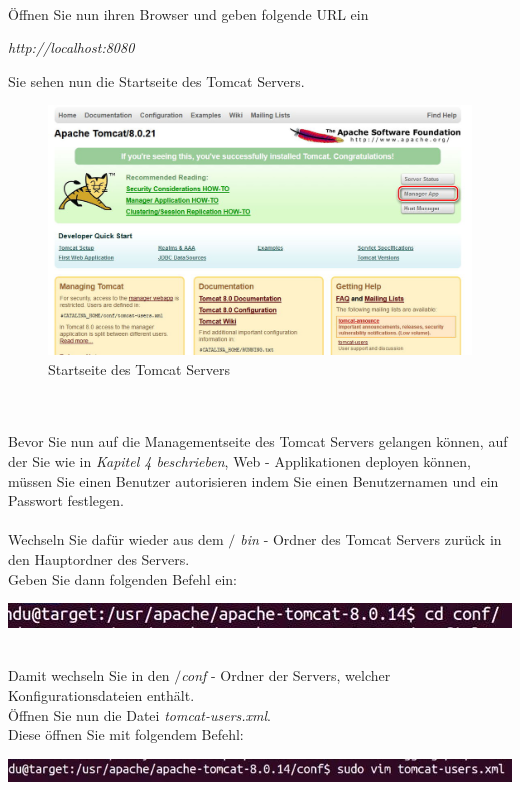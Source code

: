 \documentclass[a4paper, 12pt]{scrreprt}
\begin{document}
\ \\
Öffnen Sie nun ihren Browser und geben folgende URL ein
\begin{center}
	{\it http://localhost:8080}
\end{center}
Sie sehen nun die Startseite des Tomcat Servers.\begin{figure}
\centering
\includegraphics[width=0.8\linewidth]{Grafiken/ServerStartPage}
\caption{Startseite des Tomcat Servers}
\label{fig:ServerStartPage1}
\end{figure}
\ \\
\newpage
\ \\
Bevor Sie nun  auf die Managementseite des Tomcat Servers gelangen können, auf der Sie wie in {\it Kapitel 4 beschrieben}, Web - Applikationen deployen können, müssen Sie einen Benutzer autorisieren indem Sie einen Benutzernamen und ein Passwort festlegen.\ \\
\ \\
Wechseln Sie dafür wieder aus dem {\it$/$ bin} - Ordner des Tomcat Servers zurück in den Hauptordner des Servers.\\
Geben Sie dann folgenden Befehl ein:
\begin{center}
\includegraphics[width=0.7\linewidth]{Grafiken/conf-ordner}
\end{center}
\ \\
Damit wechseln Sie in den {\it $/$conf} - Ordner der Servers, welcher Konfigurationsdateien enthält.\\
Öffnen Sie nun die Datei {\it tomcat-users.xml}.\\
Diese öffnen Sie mit folgendem Befehl:
\begin{center}
\includegraphics[width=0.8\linewidth]{Grafiken/zomcat_users}
\end{center}
\end{document}
